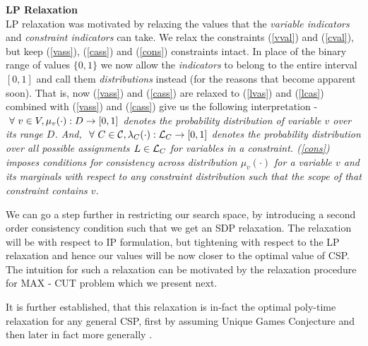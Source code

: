 \begin{discussion}{\bf LP Relaxation}\\
LP relaxation was motivated by relaxing the values that the \textit{variable indicators} and \textit{constraint indicators} can take. 
We relax the constraints (\ref{vval}) and (\ref{cval}), but keep (\ref{vass}), (\ref{cass})  and (\ref{cons}) constraints intact. 
In place of the binary range of values $\{0, 1\}$ we now allow the \textit{indicators} to belong to the entire interval $[0, 1]$ and call them \textit{distributions} instead (for the reasons that become apparent soon).
That is, now (\ref{vass}) and (\ref{cass}) are relaxed to 
(\ref{lvas}) and (\ref{lcas}) combined with (\ref{vass}) and (\ref{cass}) give us the following interpretation - \\
\textit{$\ \forall \  v \in V, \mu_v(\cdot) : D \rightarrow [0, 1]$ denotes the \textit{probability distribution of variable $v$ over its range $D$}. And, $\ \forall \  C \in \mathcal{C}, \lambda_C(\cdot) : \mathcal{L}_C \rightarrow [0,1]$ denotes the \textit{probability distribution over all possible assignments $L \in \mathcal{L}_C$ for variables in a constraint}.  (\ref{cons}) imposes conditions for consistency across \textit{distribution} $\mu_v(\cdot)$ for a variable $v$ and its marginals with respect to any constraint distribution such that the scope of that constraint contains $v$.}
\end{discussion}

We can go a step further in restricting our search space, by introducing a second order consistency condition such that we get an SDP relaxation. 
The relaxation will be with respect to IP formulation, but tightening with respect to the LP relaxation and hence our values will be now closer to the optimal value of CSP. 
The intuition for such a relaxation can be motivated by the relaxation procedure for MAX - CUT problem which we present next. 

It is further established, that this relaxation is in-fact the optimal poly-time relaxation for any general CSP, first by assuming Unique Games Conjecture \cite{Khot} and then later in fact more generally \cite{nphard}. 

